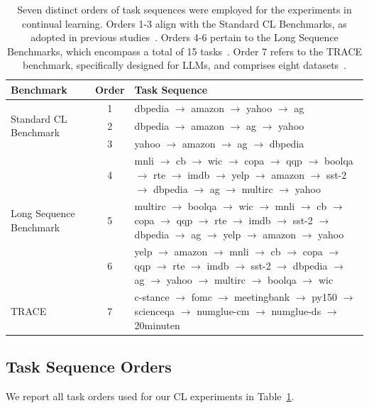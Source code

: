 \begin{table}[h]
\centering
\begin{tabular}{lcp{10cm}}
\toprule
\textbf{Benchmark} & \textbf{Order} & \textbf{Task Sequence} \\
\midrule
\multirow{3}{*}{Standard CL Benchmark} 
  & 1 & dbpedia $\rightarrow$ amazon $\rightarrow$ yahoo $\rightarrow$ ag \\
  & 2 & dbpedia $\rightarrow$ amazon $\rightarrow$ ag $\rightarrow$ yahoo \\
  & 3 & yahoo $\rightarrow$ amazon $\rightarrow$ ag $\rightarrow$ dbpedia \\
\midrule
\multirow{3}{*}{Long Sequence Benchmark} 
  & 4 & mnli $\rightarrow$ cb $\rightarrow$ wic $\rightarrow$ copa $\rightarrow$ qqp $\rightarrow$ boolqa $\rightarrow$ rte $\rightarrow$ imdb $\rightarrow$ yelp $\rightarrow$ amazon $\rightarrow$ sst-2 $\rightarrow$ dbpedia $\rightarrow$ ag $\rightarrow$ multirc $\rightarrow$ yahoo \\
  & 5  & multirc $\rightarrow$ boolqa $\rightarrow$ wic $\rightarrow$ mnli $\rightarrow$ cb $\rightarrow$ copa $\rightarrow$ qqp $\rightarrow$ rte $\rightarrow$ imdb $\rightarrow$ sst-2 $\rightarrow$ dbpedia $\rightarrow$ ag $\rightarrow$ yelp $\rightarrow$ amazon $\rightarrow$ yahoo \\
  & 6 & yelp $\rightarrow$ amazon $\rightarrow$ mnli $\rightarrow$ cb $\rightarrow$ copa $\rightarrow$ qqp $\rightarrow$ rte $\rightarrow$ imdb $\rightarrow$ sst-2 $\rightarrow$ dbpedia $\rightarrow$ ag $\rightarrow$ yahoo $\rightarrow$ multirc $\rightarrow$ boolqa $\rightarrow$ wic \\
\midrule
\multirow{1}{*}{TRACE}
  & 7 & c-stance $\rightarrow$ fomc $\rightarrow$ meetingbank $\rightarrow$ py150 $\rightarrow$ scienceqa $\rightarrow$ numglue-cm $\rightarrow$ numglue-ds $\rightarrow$ 20minuten \\
\bottomrule
\end{tabular}
\caption{
Seven distinct orders of task sequences were employed for the experiments in continual learning. Orders 1-3 align with the Standard CL Benchmarks, as adopted in previous studies~\cite{liao2025data}. Orders 4-6 pertain to the Long Sequence Benchmarks, which encompass a total of 15 tasks~\cite{razdaibiedina2023progressive}. Order 7 refers to the TRACE benchmark, specifically designed for LLMs, and comprises eight datasets~\cite{wang2023trace}.
}
\label{tab:task_orders}
\end{table}
\subsection{Task Sequence Orders}
\label{task:sequence:order}
We report all task orders used for our CL experiments
in Table~\ref{tab:task_orders}.

